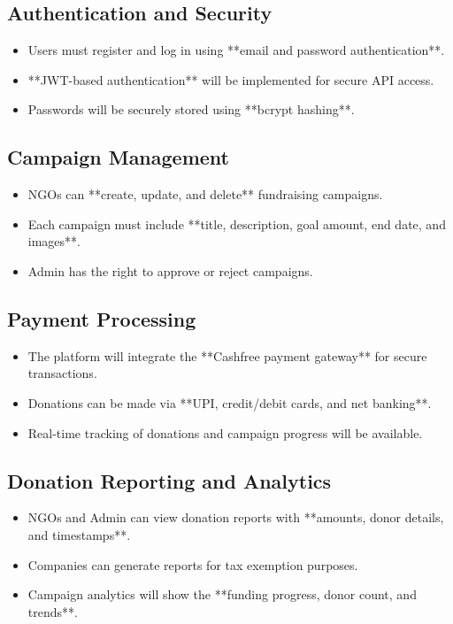 \subsection{Authentication and Security}
\begin{itemize}
    \item Users must register and log in using **email and password authentication**.
    \item **JWT-based authentication** will be implemented for secure API access.
    \item Passwords will be securely stored using **bcrypt hashing**.
\end{itemize}

\subsection{Campaign Management}
\begin{itemize}
    \item NGOs can **create, update, and delete** fundraising campaigns.
    \item Each campaign must include **title, description, goal amount, end date, and images**.
    \item Admin has the right to approve or reject campaigns.
\end{itemize}

\subsection{Payment Processing}
\begin{itemize}
    \item The platform will integrate the **Cashfree payment gateway** for secure transactions.
    \item Donations can be made via **UPI, credit/debit cards, and net banking**.
    \item Real-time tracking of donations and campaign progress will be available.
\end{itemize}

\subsection{Donation Reporting and Analytics}
\begin{itemize}
    \item NGOs and Admin can view donation reports with **amounts, donor details, and timestamps**.
    \item Companies can generate reports for tax exemption purposes.
    \item Campaign analytics will show the **funding progress, donor count, and trends**.
\end{itemize}

